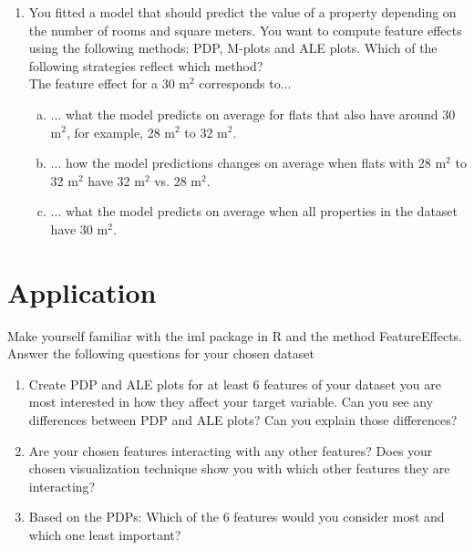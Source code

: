 \begin{enumerate}
\item You fitted a model that should predict the value of a property depending on 
    the number of rooms and square meters. 
    You want to compute feature effects using the following methods: 
    PDP, M-plots and ALE plots. 
    Which of the following strategies reflect which method? \\
    The feature effect for a 30 m$^2$ corresponds to... 
\begin{enumerate}[a)]
  \item ... what the model predicts on average for flats that also have around 30 m$^2$, for example, 28 m$^2$ to 32 m$^2$. 
  \item ... how the model predictions changes on average when flats with 28 m$^2$ to 32 m$^2$ have 32 m$^2$ vs. 28 m$^2$. 
  \item ... what the model predicts on average when all properties in the dataset have 30 m$^2$. 
\end{enumerate}

\end{enumerate}

\section{Application}

Make yourself familiar with the iml package in R and the method FeatureEffects.
Answer the following questions for your chosen dataset
\begin{enumerate}
\item Create PDP and ALE plots for at least 6 features of your dataset you are most interested in how they affect your target variable. Can you see any differences between PDP and ALE plots? Can you explain those differences?
\item Are your chosen features interacting with any other features? Does your chosen visualization technique show you with which other features they are interacting?
\item Based on the PDPs: Which of the 6 features would you consider most and which one least important?
\end{enumerate}

